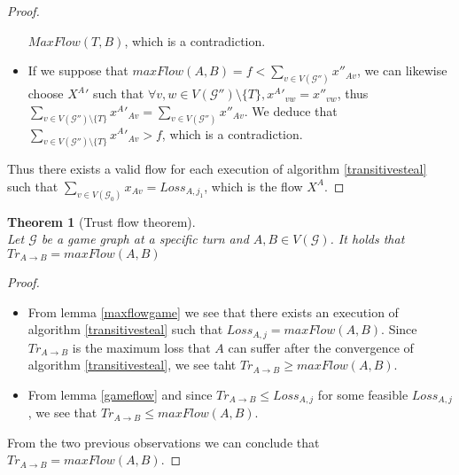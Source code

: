 \documentclass[11pt]{article}
\newtheorem{theorem}{Theorem}[section]
\theoremstyle{definition}
\theoremstyle{corollary}
\theoremstyle{lemma}
\begin{document}
\begin{proof}
\begin{itemize}
          $MaxFlow(T, B)$, which is a contradiction.
          \item If we suppose that $maxFlow(A, B) = f < \sum\limits_{v \in V(\mathcal{G}'')}x''_{Av}$, we can likewise choose
          ${X^A}'$ such that $\forall v, w \in V(\mathcal{G}'') \setminus \{T\}, {x^A}'_{vw} = x''_{vw}$, thus
          $\sum\limits_{v \in V(\mathcal{G}'') \setminus \{T\}}{x^A}'_{Av} = \sum\limits_{v \in V(\mathcal{G}'')}x''_{Av}$.
          We deduce that $\sum\limits_{v \in V(\mathcal{G}'') \setminus \{T\}}{x^A}'_{Av} > f$, which is a contradiction.
       \end{itemize}
       Thus there exists a valid flow for each execution of algorithm \ref{transitivesteal} such that $\sum\limits_{v \in
       V(\mathcal{G}_0)}x_{Av} = Loss_{A, j_1}$, which is the flow $X^A$.
    \end{proof}
    \begin{theorem}[Trust flow theorem] \ \\
       \label{trustflow}
       Let $\mathcal{G}$ be a game graph at a specific turn and $A, B \in V(\mathcal{G})$. It holds that
       $Tr_{A \rightarrow B} = maxFlow(A, B)$
    \end{theorem}
    \begin{proof} \ \\
       \begin{itemize}
          \item From lemma \ref{maxflowgame} we see that there exists an execution of algorithm \ref{transitivesteal} such
          that $Loss_{A, j} = maxFlow(A, B)$. Since $Tr_{A \rightarrow B}$ is the maximum loss that $A$ can suffer after the
          convergence of algorithm \ref{transitivesteal}, we see taht $Tr_{A \rightarrow B} \geq maxFlow(A, B)$.
          \item From lemma \ref{gameflow} and since $Tr_{A \rightarrow B} \leq Loss_{A, j}$ for some feasible $Loss_{A, j}$,
          we see that $Tr_{A \rightarrow B} \leq maxFlow(A, B)$.
       \end{itemize}
       From the two previous observations we can conclude that $Tr_{A \rightarrow B} = maxFlow(A, B)$.
    \end{proof}
\end{document}

